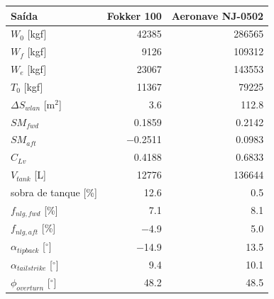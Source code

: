 \begin{tabular}{lrr}
\toprule
Sa\'ida & Fokker 100 & Aeronave NJ-0502 \\
\midrule
$W_0$ [kgf] & 42385 & 286565 \\
$W_f$ [kgf] & 9126 & 109312 \\
$W_e$ [kgf] & 23067 & 143553 \\
$T_0$ [kgf] & 11367 & 79225 \\
$\Delta S_{wlan}$ [m$^2$] & 3.6 & 112.8 \\
$SM_{fwd}$ & 0.1859 & 0.2142 \\
$SM_{aft}$ & $-$0.2511 & 0.0983 \\
$C_{Lv}$ & 0.4188 & 0.6833 \\
$V_{tank}$ [L] & 12776 & 136644 \\
sobra de tanque [\%] & 12.6 & 0.5 \\
$f_{nlg,fwd}$ [\%] & 7.1 & 8.1 \\
$f_{nlg,aft}$ [\%] & $-$4.9 & 5.0 \\
$\alpha_{tipback}$ [$^\circ$] & $-$14.9 & 13.5 \\
$\alpha_{tailstrike}$ [$^\circ$] & 9.4 & 10.1 \\
$\phi_{overturn}$ [$^\circ$] & 48.2 & 48.5 \\
\bottomrule
\end{tabular}